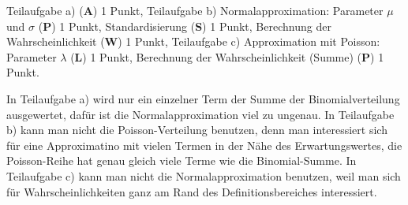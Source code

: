 \begin{bewertung}
Teilaufgabe a) ({\bf A}) 1 Punkt,
Teilaufgabe b) Normalapproximation:
Parameter $\mu$ und $\sigma$ ({\bf P}) 1 Punkt,
Standardisierung ({\bf S}) 1 Punkt,
Berechnung der Wahrscheinlichkeit ({\bf W}) 1 Punkt,
Teilaufgabe c) Approximation mit Poisson: Parameter $\lambda$ ({\bf L}) 1 Punkt,
Berechnung der Wahrscheinlichkeit (Summe) ({\bf P}) 1 Punkt.
\end{bewertung}

\begin{diskussion}
In Teilaufgabe a) wird nur ein einzelner Term der Summe der
Binomialverteilung ausgewertet, dafür ist die Normalapproximation viel
zu ungenau.
In Teilaufgabe b) kann man nicht die Poisson-Verteilung benutzen, denn
man interessiert sich für eine Approximatino mit vielen Termen in der
Nähe des Erwartungswertes, die Poisson-Reihe hat genau gleich viele
Terme wie die Binomial-Summe.
In Teilaufgabe c) kann man nicht die Normalapproximation benutzen, weil
man sich für Wahrscheinlichkeiten ganz am Rand des Definitionsbereiches
interessiert.
\end{diskussion}

